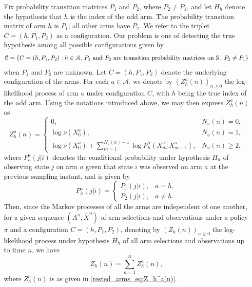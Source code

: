 Fix probability transition matrices $P_1$ and $P_2$, where $P_2\neq P_1$, and let $H_{h}$ denote the hypothesis that $h$ is the index of the odd arm. The probability transition matrix of arm $h$ is $P_1$; all other arms have $P_2$. We refer to the triplet $C=(h,P_1,P_2)$ as a configuration. Our problem is one of detecting the true hypothesis among all possible configurations given by $$\mathcal{C}=\{C=(h,P_1,P_2):h\in\mathcal{A},\,\textcolor{black}{P_1\text{ and }P_2\text{ are transition probability matrices on }\mathcal{S}},\, \,P_2\neq P_1\}$$
when $P_1$ and $P_2$ are unknown. Let $C=(h,P_1,P_2)$ denote the underlying configuration of the arms. For each $a\in\mathcal{A}$, we denote by $(Z_h^a(n))_{n\geq 0}$ the log-likelihood process of arm $a$ under configuration $C$, with $h$ being the true index of the odd arm. Using the notations introduced above, we may then express $Z_h^a(n)$ as
\begin{equation}
	Z_h^a(n)=
\begin{cases}
	0,& N_a(n)=0,\\
	\log \nu(X_0^a),& N_a(n)=1,\\
	\log\nu(X_0^a)+\sum\limits_{m=1}^{N_a(n)-1}\log P_h^a(X_m^a|X_{m-1}^a),& N_a(n)\geq 2,
\end{cases}
\label{rested_arms_eq:Z_h^a(n)}
\end{equation}
where $P_h^a(j|i)$ denotes the conditional probability under hypothesis $H_h$ of observing state $j$ on arm $a$ given that state $i$ was observed on arm $a$ at the previous sampling instant, and is given by
\begin{equation}
	P_h^a(j|i)=\begin{cases}
		P_1(j|i),&a=h,\\
		P_2(j|i),&a\neq h.
	\end{cases}
	\label{rested_arms_eq:P_h^a(j|i)}
\end{equation}
Then, since the Markov processes of all the arms are independent of one another, for a given sequence $(A^n,\bar{X}^n)$ of arm selections and observations under a policy $\pi$ and a configuration $C=(h,P_1,P_2)$, denoting by $(Z_h(n))_{n\geq 0}$ the log-likelihood process under hypothesis $H_h$ of all arm selections and observations up to time $n$, we have
\begin{equation}
Z_h(n)=\sum\limits_{a=1}^{K}Z_h^a(n),\label{rested_arms_eq:log_likelihood_under_hyp_h}
\end{equation}
where $Z_h^a(n)$ is as given in \eqref{rested_arms_eq:Z_h^a(n)}.
